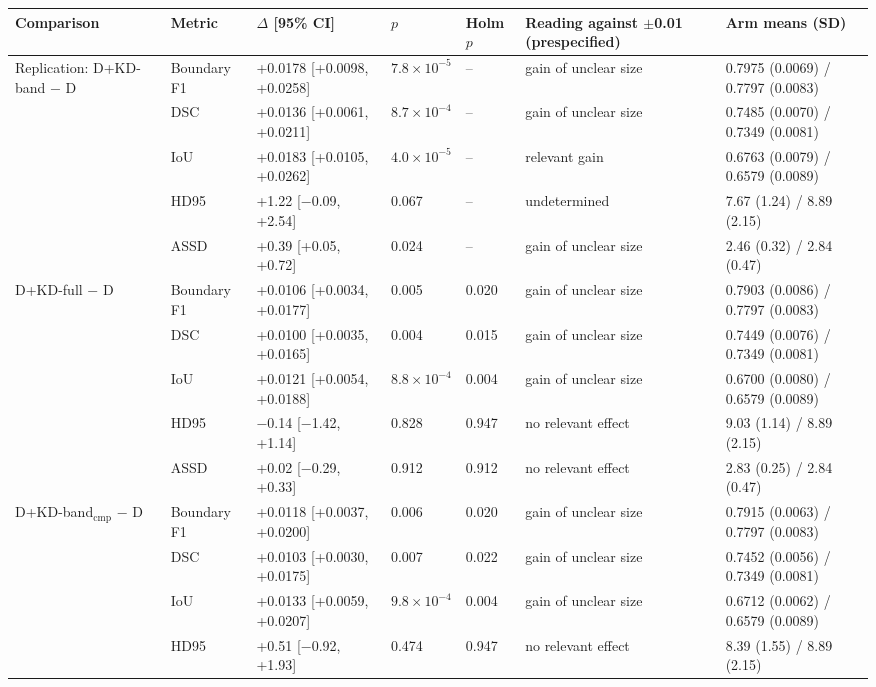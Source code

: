 \begin{tabular}{@{}lllllll@{}}
\toprule
Comparison & Metric & $\Delta$ [95\% CI] & $p$ & Holm $p$ & Reading against $\pm$0.01 (prespecified) & Arm means (SD) \\
\midrule
Replication: D+KD-band $-$ D & Boundary F1 & +0.0178 [+0.0098, +0.0258] & $7.8\times10^{-5}$ & -- & gain of unclear size & 0.7975 (0.0069) / 0.7797 (0.0083) \\
 & DSC & +0.0136 [+0.0061, +0.0211] & $8.7\times10^{-4}$ & -- & gain of unclear size & 0.7485 (0.0070) / 0.7349 (0.0081) \\
 & IoU & +0.0183 [+0.0105, +0.0262] & $4.0\times10^{-5}$ & -- & relevant gain & 0.6763 (0.0079) / 0.6579 (0.0089) \\
 & HD95 & +1.22 [$-$0.09, +2.54] & 0.067 & -- & undetermined & 7.67 (1.24) / 8.89 (2.15) \\
 & ASSD & +0.39 [+0.05, +0.72] & 0.024 & -- & gain of unclear size & 2.46 (0.32) / 2.84 (0.47) \\
\midrule
D+KD-full $-$ D & Boundary F1 & +0.0106 [+0.0034, +0.0177] & 0.005 & 0.020 & gain of unclear size & 0.7903 (0.0086) / 0.7797 (0.0083) \\
 & DSC & +0.0100 [+0.0035, +0.0165] & 0.004 & 0.015 & gain of unclear size & 0.7449 (0.0076) / 0.7349 (0.0081) \\
 & IoU & +0.0121 [+0.0054, +0.0188] & $8.8\times10^{-4}$ & 0.004 & gain of unclear size & 0.6700 (0.0080) / 0.6579 (0.0089) \\
 & HD95 & $-$0.14 [$-$1.42, +1.14] & 0.828 & 0.947 & no relevant effect & 9.03 (1.14) / 8.89 (2.15) \\
 & ASSD & +0.02 [$-$0.29, +0.33] & 0.912 & 0.912 & no relevant effect & 2.83 (0.25) / 2.84 (0.47) \\
\midrule
D+KD-band$_{\mathrm{cmp}}$ $-$ D & Boundary F1 & +0.0118 [+0.0037, +0.0200] & 0.006 & 0.020 & gain of unclear size & 0.7915 (0.0063) / 0.7797 (0.0083) \\
 & DSC & +0.0103 [+0.0030, +0.0175] & 0.007 & 0.022 & gain of unclear size & 0.7452 (0.0056) / 0.7349 (0.0081) \\
 & IoU & +0.0133 [+0.0059, +0.0207] & $9.8\times10^{-4}$ & 0.004 & gain of unclear size & 0.6712 (0.0062) / 0.6579 (0.0089) \\
 & HD95 & +0.51 [$-$0.92, +1.93] & 0.474 & 0.947 & no relevant effect & 8.39 (1.55) / 8.89 (2.15) \\

\end{tabular}
